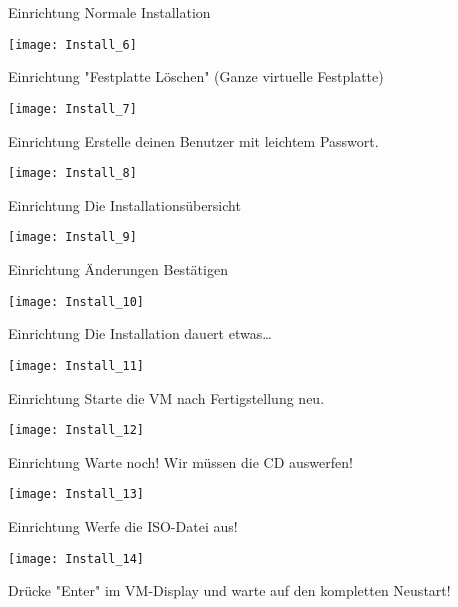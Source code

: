 \begin{frame}{Einrichtung}
    Normale Installation
    \begin{center}
        \texttt{[image: Install\_6]}
    \end{center}
\end{frame}

\begin{frame}{Einrichtung}
    "Festplatte Löschen" (Ganze virtuelle Festplatte)
    \begin{center}
        \texttt{[image: Install\_7]}
    \end{center}
\end{frame}

\begin{frame}{Einrichtung}
    Erstelle deinen Benutzer mit leichtem Passwort.
    \begin{center}
        \texttt{[image: Install\_8]}
    \end{center}
\end{frame}

\begin{frame}{Einrichtung}
    Die Installationsübersicht
    \begin{center}
        \texttt{[image: Install\_9]}
    \end{center}
\end{frame}

\begin{frame}{Einrichtung}
    Änderungen Bestätigen
    \begin{center}
        \texttt{[image: Install\_10]}
    \end{center}
\end{frame}

\begin{frame}{Einrichtung}
    Die Installation dauert etwas\dots
    \begin{center}
        \texttt{[image: Install\_11]}
    \end{center}
\end{frame}

\begin{frame}{Einrichtung}
    Starte die VM nach Fertigstellung neu.
    \begin{center}
        \texttt{[image: Install\_12]}
    \end{center}
\end{frame}

\begin{frame}{Einrichtung}
    Warte noch! Wir müssen die CD auswerfen!
    \begin{center}
        \texttt{[image: Install\_13]}
    \end{center}
\end{frame}

\begin{frame}{Einrichtung}
    Werfe die ISO-Datei aus!
    \begin{center}
        \texttt{[image: Install\_14]}
    \end{center}
    Drücke "Enter" im VM-Display und warte auf den kompletten Neustart!
\end{frame}